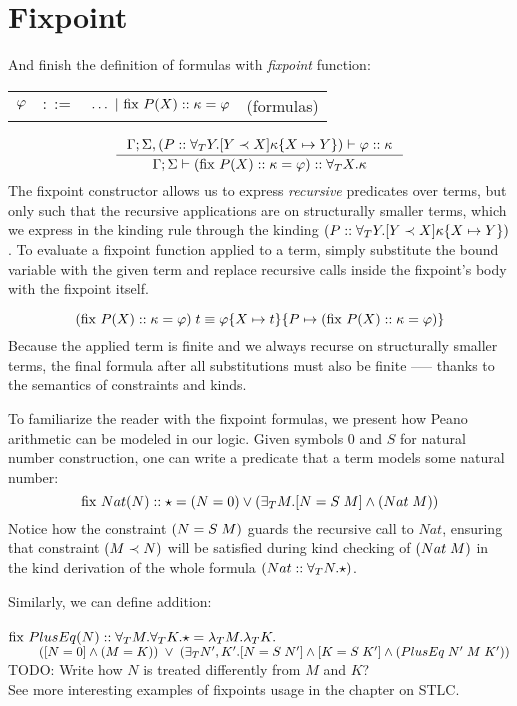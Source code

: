 \documentclass[english, mgr]{iithesis}
\begin{document}
\section{Fixpoint}
\newcommand{\fix}[3]{\ensuremath{\text{fix }#1(#2)\ofkind#3=}}
And finish the definition of formulas with \textit{fixpoint} function:

\begin{tabular}{rrlr}
$\varphi$ & $::=$ & $\ldots
               \bnfor \fix{\propv}{\termv}{\kind}{\formphi} $
    & (formulas)
\end{tabular}
$$
\inference{
  \cEnv;\kEnv, (\propv \ofkind \kForallTerm{Y} \kGuard{Y \cshlt \termv}{\kind\subst{\termv}{Y}})\vdash \formphi \ofkind \kind
}{
  \cEnv;\kEnv\vdash (\fix{\propv}{\termv}{\kind}{\formphi}) \ofkind \kForallTerm{\termv}{\kind}
}
$$
The fixpoint constructor allows us to express \textit{recursive} predicates over terms,
but only such that the recursive applications are on structurally smaller terms,
which we express in the kinding rule through the kinding $(P :: \forall_T Y . [Y \prec X]{\kappa\{X\mapsto Y\}})$.
To evaluate a fixpoint function applied to a term, simply substitute the bound
variable with the given term and replace recursive calls inside the fixpoint's body with the fixpoint itself.

$$
(\fix{\propv}{\termv}{\kind}{\formphi})\fApp\term
\equiv
\formphi\subst{\termv}{\term}\subst{\propv}{(\fix{\propv}{\termv}{\kind}{\formphi})}
$$
Because the applied term is finite
and we always recurse on structurally smaller terms,
the final formula after all substitutions must also be finite
--— thanks to the semantics of constraints and kinds.

To familiarize the reader with the fixpoint formulas,
we present how Peano arithmetic can be modeled in our logic.
Given symbols $0$ and $S$ for natural number construction,
one can write a predicate that a term models some natural number:
$$
\fix{Nat}{N}{\kProp}{(N \ceq 0) \vee (\fExistsTerm{M} \fCAnd{N \ceq {S \tapp M}} ({Nat}\fAppTerm{M}))}
$$
Notice how the constraint $(N = {S \; M})$ guards the recursive call to $Nat$,
ensuring that constraint $(M \prec N)$ will be satisfied during kind checking of
$({{Nat}\;M})$ in the kind derivation of the whole formula
$({Nat} :: \forall_T N .{\star})$.

Similarly, we can define addition: \\ \\
$\fix{PlusEq}{N}{\kForallTerm{M}\kForallTerm{K}\kProp}{\fLamTerm{M}\fLamTerm{K}}$ \\
$\text{ }\qquad
  ([N = 0]\wedge{(M =K)}) \;\vee\;
   (\exists_T N', K' .[N = {S \; N'}]\wedge[K = {S \; K'}]\wedge{({PlusEq}\;{N'}\;{M}\;{K'})}
   )
$
\\
TODO: Write how $N$ is treated differently from $M$ and $K$?
\\
See more interesting examples of fixpoints usage in the chapter on STLC.
\end{document}

